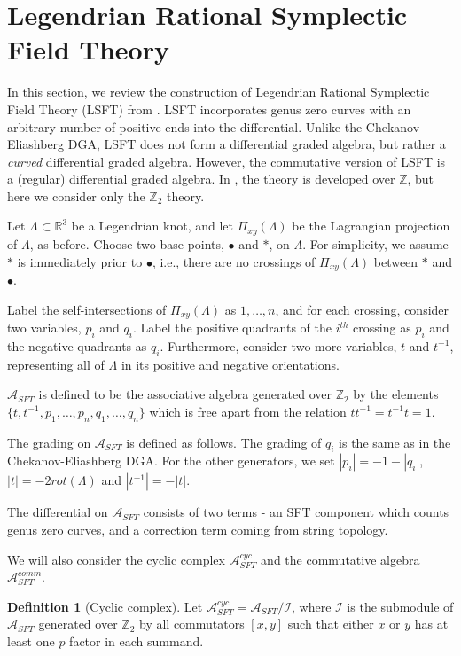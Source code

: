 \documentclass[a4paper,final, reqno]{amsart}
\theoremstyle{plain}
\theoremstyle{definition}
\newtheorem{Def}[Th]{Definition}
\newcommand{\A}{\mathcal{A}}
\begin{document}
	
	
	\section{Legendrian Rational Symplectic Field Theory}\label{sec:lsft}
	
	
	In this section, we review the construction of Legendrian Rational Symplectic Field Theory (LSFT) from \cite{ng}. LSFT incorporates genus zero curves with an arbitrary number of positive ends into the differential. Unlike the Chekanov-Eliashberg DGA, LSFT does not form a differential graded algebra, but rather a \emph{curved} differential graded algebra. However, the commutative version of LSFT is a (regular) differential graded algebra. In \cite{ng}, the theory is developed over $\mathbb{Z}$, but here we consider only the $\mathbb{Z}_2$ theory. 
	
	Let $\Lambda \subset \mathbb{R}^3$ be a Legendrian knot, and let $\Pi_{xy}(\Lambda)$ be the Lagrangian projection of $\Lambda$, as before. Choose two base points, $\bullet$ and $*$, on $\Lambda$. For simplicity, we assume $*$ is immediately prior to $\bullet$, i.e., there are no crossings of $\Pi_{xy}(\Lambda)$ between $*$ and $\bullet$. 
	
	Label the self-intersections of $\Pi_{xy}(\Lambda)$ as $1,\dots, n$, and for each crossing, consider two variables, $p_i$ and $q_i$. Label the positive quadrants of the $i^{th}$ crossing as $p_i$ and the negative quadrants as $q_i$. Furthermore, consider two more variables, $t$ and $t^{-1}$, representing all of $\Lambda$ in its positive and negative orientations. 
	
	$\A_{SFT}$ is defined to be the associative algebra generated over $\mathbb{Z}_2$ by the elements $\{t, t^{-1}, p_1, \dots, p_n, q_1, \dots, q_n\}$ which is free apart from the relation $tt^{-1} = t^{-1}t=1$. 
	
	The grading on $\A_{SFT}$ is defined as follows. The grading of $q_i$ is the same as in the Chekanov-Eliashberg DGA. For the other generators, we set $|p_i| = -1-|q_i|$, $|t| = -2rot(\Lambda)$ and $|t^{-1}| = -|t|$. 
	
	The differential on $\A_{SFT}$ consists of two terms - an SFT component which counts genus zero curves, and a correction term coming from string topology. 
	
	We will also consider the cyclic complex $\A_{SFT}^{cyc}$ and the commutative algebra $\A_{SFT}^{comm}$. 
	
	
	\begin{Def}[Cyclic complex] %
		Let $\A_{SFT}^{cyc} = \A_{SFT}/\mathcal{I}$, where $\mathcal{I}$ is the submodule of $\A_{SFT}$ generated over $\mathbb{Z}_2$ by all commutators $[x,y]$ such that either $x$ or $y$ has at least one $p$ factor in each summand.
	\end{Def}
	
\end{document}
